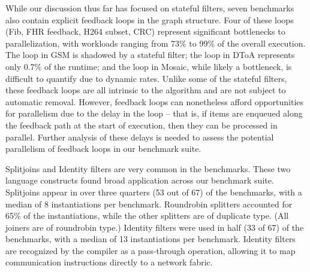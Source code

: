   While our discussion thus far
has focused on stateful filters, seven benchmarks also contain
explicit feedback loops in the graph structure.  Four of these loops
(Fib, FHR feedback, H264 subset, CRC) represent significant
bottlenecks to parallelization, with workloads ranging from 73\% to
99\% of the overall execution.  The loop in GSM is shadowed by a
stateful filter; the loop in DToA represents only 0.7\% of the
runtime; and the loop in Mosaic, while likely a bottleneck, is
difficult to quantify due to dynamic rates.  Unlike some of the
stateful filters, these feedback loops are all intrinsic to the
algorithm and are not subject to automatic removal.  However, feedback
loops can nonetheless afford opportunities for parallelism due to the
delay in the loop -- that is, if items are enqueued along the feedback
path at the start of execution, then they can be processed in
parallel.  Further analysis of these delays is needed to assess the
potential parallelism of feedback loops in our benchmark suite.


\item {\boldit Splitjoins and Identity filters are very common in the 
benchmarks.}  These two language constructs found broad application
across our benchmark suite.  Splitjoins appear in over three quarters
(53 out of 67) of the benchmarks, with a median of 8 instantiations
per benchmark.  Roundrobin splitters accounted for 65\% of the
instantiations, while the other splitters are of duplicate type.  (All
joiners are of roundrobin type.)  Identity filters were used in half
(33 of 67) of the benchmarks, with a median of 13 instantiations per
benchmark.  Identity filters are recognized by the compiler as a
pass-through operation, allowing it to map communication instructions
directly to a network fabric.

